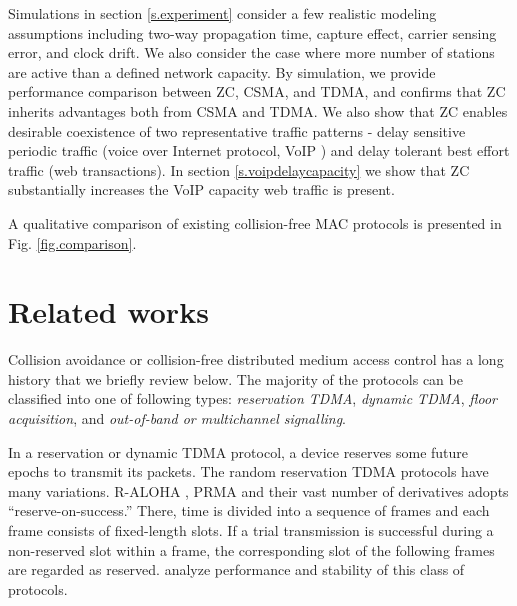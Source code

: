 \documentclass{acm_proc_article-sp}
\begin{document}
Simulations in section \ref{s.experiment} consider a few realistic modeling assumptions including two-way propagation time, capture effect, carrier sensing error, and clock drift. We also consider the case where more number of stations are active than a defined network capacity. By simulation, we provide performance comparison between ZC, CSMA, and TDMA, and confirms that ZC inherits advantages both from CSMA and TDMA. We also show that ZC enables desirable coexistence of two representative traffic patterns - delay sensitive periodic traffic (voice over Internet protocol, VoIP \cite{2002VOIP}) and delay tolerant best effort traffic (web transactions). In section \ref{s.voipdelaycapacity} we show that ZC substantially increases the VoIP capacity web traffic is present.

A qualitative comparison of existing collision-free MAC protocols is presented in Fig. \ref{fig.comparison}.
\begin{figure*}[!t]
  \begin{center}
  \caption{Qualitative comparison of Distributed MAC protocols}
  \label{fig.comparison}
  \end{center}
\vspace{-0.2in}
\end{figure*}


\section{Related works}
Collision avoidance or collision-free distributed medium access control has a long history that we briefly review below. The majority of the protocols can be classified into one of following types: {\em reservation TDMA}, {\em dynamic TDMA}, {\em floor acquisition},  and {\em out-of-band or multichannel signalling}.



In a reservation or dynamic TDMA protocol, a device reserves some future epochs to transmit its packets. The random reservation TDMA protocols have many variations. R-ALOHA \cite{1973RALOHA}, PRMA \cite{1989PRMA} and their vast number of derivatives adopts ``reserve-on-success.'' There, time is divided into a sequence of frames and each frame consists of fixed-length slots. If a trial transmission is successful during a non-reserved slot within a frame, the corresponding slot of the following frames are regarded as reserved. \cite{2000FANTACCI} \cite{1983TASAKA} analyze performance and stability of this class of protocols.
\end{document}
